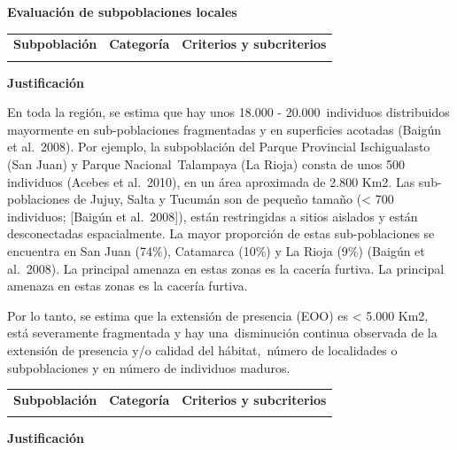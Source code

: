 \documentclass[
  x11names]{article}
\begin{document}
\textbf{Evaluación de subpoblaciones locales}

\begin{tabu} to 
\toprule
\textbf{Subpoblación} & \textbf{Categoría} & \textbf{Criterios y subcriterios}\\
\midrule
{} &  & \\
\bottomrule
\end{tabu}

\textbf{Justificación}

En toda la región, se estima que hay unos 18.000 - 20.000~individuos
distribuidos mayormente en sub-poblaciones fragmentadas y en superficies
acotadas (Baigún et al.~2008). Por ejemplo, la subpoblación del Parque
Provincial Ischigualasto (San Juan) y Parque Nacional~Talampaya (La
Rioja) consta de unos 500 individuos (Acebes et al.~2010), en un área
aproximada de 2.800 Km2. Las sub-poblaciones de Jujuy, Salta y Tucumán
son de pequeño tamaño (\textless{} 700 individuos; {[}Baigún et
al.~2008{]}), están restringidas a sitios aislados y están desconectadas
espacialmente. La mayor proporción de estas sub-poblaciones se encuentra
en San Juan (74\%), Catamarca (10\%) y La Rioja (9\%) (Baigún et
al.~2008). La principal amenaza en estas zonas es la cacería furtiva. La
principal amenaza en estas zonas es la cacería furtiva.

Por lo tanto, se estima que la extensión de presencia (EOO) es
\textless{} 5.000 Km2, está severamente fragmentada y hay
una~disminución continua observada de la extensión de presencia y/o
calidad del hábitat,~número de localidades o subpoblaciones y en número
de individuos maduros.\vspace{0.5cm}

\begin{tabu} to 
\toprule
\textbf{Subpoblación} & \textbf{Categoría} & \textbf{Criterios y subcriterios}\\
\midrule
{} &  & \\
\bottomrule
\end{tabu}

\textbf{Justificación}
\end{document}
